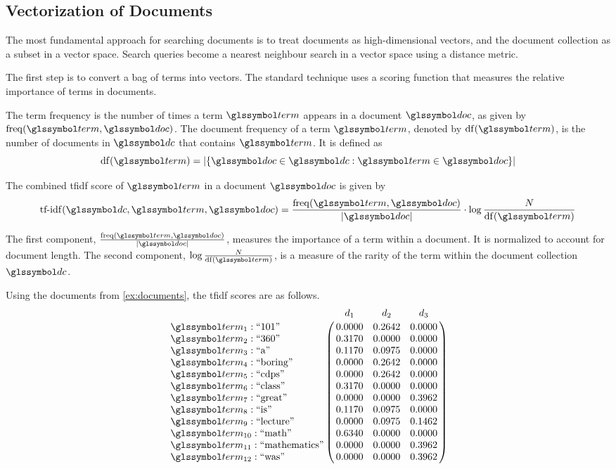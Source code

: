 	\subsection{Vectorization of Documents}
	\label{sec:vectorization-of-documents}
		The most fundamental approach for searching documents is to treat documents as high-dimensional vectors, and the document collection as a subset in a vector space.  Search queries become a nearest neighbour search in a vector space using a distance metric.
		
		The first step is to convert a bag of terms into vectors.  The standard technique \cite{ir-08} uses a scoring function that measures the relative importance of terms in documents.
		
		\begin{defn}
			The term frequency is the number of times a term \(\term\) appears in a document \(\doc\), as given by \(\freq(\term, \doc)\).	The document frequency of a term \(\term\), denoted by \(\df(\term)\), is the number of documents in \(\dc\) that contains \(\term\).	 It is defined as
			\[
				\df(\term) = \abs{\{\doc \in \dc: \term \in \doc\}}
			\]
			
			The combined \gls{tfidf} score of \(\term\) in a document \(\doc\) is given by
			\[
				\tfidf(\dc, \term, \doc) = \frac{\freq(\term, \doc)}{\abs{\doc}} \cdot \log{\frac{N}{\df(\term)}}
			\]
		\end{defn}
		
		The first component, \(\frac{\freq\left(\term, \doc\right)}{\abs{\doc}}\), measures the importance of a term within a document.  It is normalized to account for document length.	 The second component, \(\log{\frac{N}{\df\left(\term\right)}}\), is a measure of the rarity of the term within the document collection \(\dc\).
		
		\begin{ex}
			Using the documents from \cref{ex:documents}, the \gls{tfidf} scores are as follows.
			\[
				\bordermatrix{
					~ & d_1 & d_2 & d_3 \cr
					\term_{1} : \text{``101''} & 0.0000 & 0.2642 & 0.0000 \cr
					\term_{2} : \text{``360''} & 0.3170 & 0.0000 & 0.0000 \cr
					\term_{3} : \text{``a''} & 0.1170 & 0.0975 & 0.0000 \cr
					\term_{4} : \text{``boring''} & 0.0000 & 0.2642 & 0.0000 \cr
					\term_{5} : \text{``cdps''} & 0.0000 & 0.2642 & 0.0000 \cr
					\term_{6} : \text{``class''} & 0.3170 & 0.0000 & 0.0000 \cr
					\term_{7} : \text{``great''} & 0.0000 & 0.0000 & 0.3962 \cr
					\term_{8} : \text{``is''} & 0.1170 & 0.0975 & 0.0000 \cr
					\term_{9} : \text{``lecture''} & 0.0000 & 0.0975 & 0.1462 \cr
					\term_{10} : \text{``math''} & 0.6340 & 0.0000 & 0.0000 \cr
					\term_{11} : \text{``mathematics''} & 0.0000 & 0.0000 & 0.3962 \cr
					\term_{12} : \text{``was''} & 0.0000 & 0.0000 & 0.3962 \cr
				}
			\]
		\end{ex}

